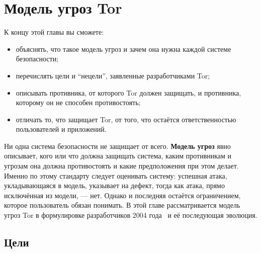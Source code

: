 \chapter{Модель угроз Tor}\label{cap:04-modello-minaccia}

\begin{obiettivi}
К концу этой главы вы сможете:
\begin{itemize}[nosep]
  \item объяснять, что такое модель угроз и зачем она нужна каждой системе безопасности;
  \item перечислять цели и \enquote{нецели}, заявленные разработчиками Tor;
  \item описывать противника, от которого Tor должен защищать, и противника, которому он не способен противостоять;
  \item отличать то, что защищает Tor, от того, что остаётся ответственностью пользователей и приложений.
\end{itemize}
\end{obiettivi}

Ни одна система безопасности не защищает от всего. \textbf{Модель угроз} явно описывает, кого или что должна защищать система, каким противникам и угрозам она должна противостоять и какие предположения при этом делает. Именно по этому стандарту следует оценивать систему: успешная атака, укладывающаяся в модель, указывает на дефект, тогда как атака, прямо исключённая из модели, --- нет. Однако и последняя остаётся ограничением, которое пользователь обязан понимать. В этой главе рассматривается модель угроз Tor в формулировке разработчиков 2004 года~\cite{dingledine2004tor} и её последующая эволюция.

\section{Цели}\label{sec:minaccia-obiettivi}

